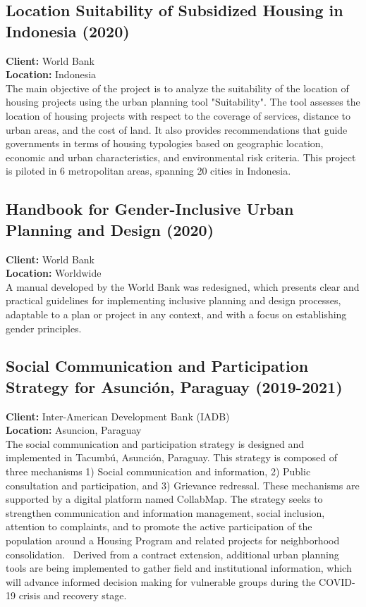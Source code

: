 \documentclass[
	a4paper,
	12pt,
	unnumberedsections,
]{CSSullivanBusinessReport}
\begin{document}
\subsection{Location Suitability of Subsidized Housing in Indonesia (2020)}
\textbf{Client:}  World Bank \\
\textbf{Location:}  Indonesia \\[0.5em]
 The main objective of the project is to analyze the suitability of the location of housing projects using the urban planning tool "Suitability". The tool assesses the location of housing projects with respect to the coverage of services, distance to urban areas, and the cost of land. It also provides recommendations that guide governments in terms of housing typologies based on geographic location, economic and urban characteristics, and environmental risk criteria. This project is piloted in 6 metropolitan areas, spanning 20 cities in Indonesia.

\subsection{Handbook for Gender-Inclusive Urban Planning and Design (2020)}
\textbf{Client:}  World Bank \\
\textbf{Location:}  Worldwide \\[0.5em]
 A manual developed by the World Bank was redesigned, which presents clear and practical guidelines for implementing inclusive planning and design processes, adaptable to a plan or project in any context, and with a focus on establishing gender principles.

\subsection{Social Communication and Participation Strategy for Asunción, Paraguay (2019-2021)}
\textbf{Client:}  Inter-American Development Bank (IADB) \\
\textbf{Location:}  Asuncion, Paraguay \\[0.5em]
 The social communication and participation strategy is designed and implemented in Tacumbú, Asunción, Paraguay. This strategy is composed of three mechanisms 1) Social communication and information, 2) Public consultation and participation, and 3) Grievance redressal. These mechanisms are supported by a digital platform named CollabMap. The strategy seeks to strengthen communication and information management, social inclusion, attention to complaints, and to promote the active participation of the population around a Housing Program and related projects for neighborhood consolidation.  Derived from a contract extension, additional urban planning tools are being implemented to gather field and institutional information, which will advance informed decision making for vulnerable groups during the COVID-19 crisis and recovery stage.
\end{document}
